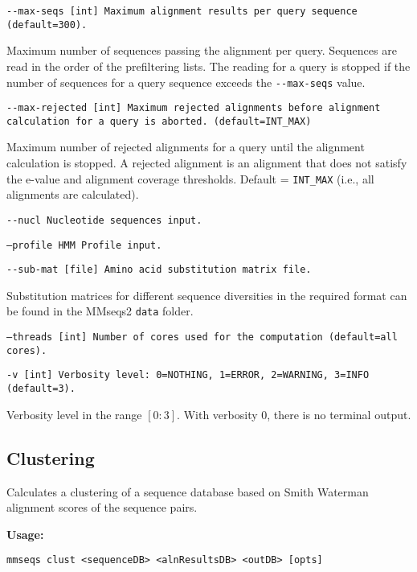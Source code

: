 \documentclass[11pt,a4paper]{scrreprt}
\begin{document}
\texttt{\small -{}-max-seqs {[}int{]} Maximum alignment results per query sequence (default=300).}{\small \par}


Maximum number of sequences passing the alignment per query. Sequences are read in the order of the prefiltering lists. The reading for a query is stopped if the number of sequences for a query sequence exceeds the \texttt{-{}-max-seqs} value.


\texttt{\small -{}-max-rejected {[}int{]} Maximum rejected alignments before alignment calculation for a query is aborted. (default=INT\_MAX)}{\small \par}


Maximum number of rejected alignments for a query until the alignment calculation is stopped. A rejected alignment is an alignment that does not satisfy the e-value and alignment coverage thresholds. Default = \texttt{INT\_MAX} (i.e., all alignments are calculated).


\texttt{\small -{}-nucl Nucleotide sequences input.}{\small \par}


\texttt{\small --profile HMM Profile input.}{\small \par}


\texttt{\small -{}-sub-mat {[}file{]} Amino acid substitution matrix file.}{\small \par}


Substitution matrices for different sequence diversities in the required format can be found in the MMseqs2 \texttt{data} folder.


\texttt{\small --threads {[}int{]} Number of cores used for the computation (default=all cores).}{\small \par}


\texttt{\small -v {[}int{]} Verbosity level: 0=NOTHING, 1=ERROR, 2=WARNING, 3=INFO (default=3).}{\small \par}


Verbosity level in the range $[0:3]$. With verbosity $0$, there is no terminal output.
\subsection{Clustering}
Calculates a clustering of a sequence database based on Smith Waterman alignment scores of the sequence pairs.


\textbf{Usage:}


\texttt{mmseqs clust <sequenceDB> <alnResultsDB> <outDB> {[}opts{]}}
\end{document}
